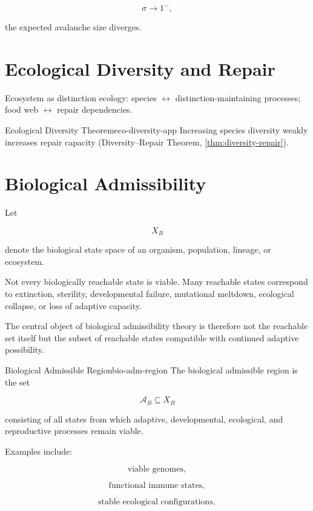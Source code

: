 \documentclass[12pt,twoside,openright]{book}
\begin{document}
\[
\sigma\rightarrow1^{-},
\]

the expected avalanche size diverges.

\section{Ecological Diversity and Repair}

Ecosystem as distinction ecology:
species $\leftrightarrow$ distinction-maintaining processes;
food web $\leftrightarrow$ repair dependencies.

\begin{theorem}{Ecological Diversity Theorem}{eco-diversity-app}
  Increasing species diversity weakly increases repair
  capacity (Diversity--Repair Theorem,
  \cref{thm:diversity-repair}).
\end{theorem}

\section{Biological Admissibility}

Let

\[
X_B
\]

denote the biological state space of an organism,
population, lineage, or ecosystem.

Not every biologically reachable state is viable.
Many reachable states correspond to extinction,
sterility, developmental failure, mutational meltdown,
ecological collapse, or loss of adaptive capacity.

The central object of biological admissibility theory is
therefore not the reachable set itself but the subset of
reachable states compatible with continued adaptive
possibility.

\begin{definition}{Biological Admissible Region}{bio-adm-region}
The biological admissible region is the set

\[
\mathcal A_B
\subseteq
X_B
\]

consisting of all states from which adaptive,
developmental, ecological, and reproductive processes
remain viable.
\end{definition}

Examples include:

\[
\text{viable genomes},
\]

\[
\text{functional immune states},
\]

\[
\text{stable ecological configurations},
\]
\end{document}
